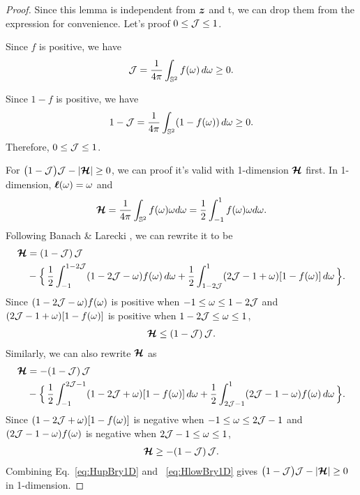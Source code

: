 \begin{proof}
  Since this lemma is independent from $\boldsymbol{z}$ and t, we can drop them from the expression for convenience.
  Let's proof $0\le\mathcal{J}\le1$.
  
  Since $f$ is positive, we have
    \begin{equation}
      \mathcal{J}=\frac{1}{4\pi}\int_{\mathbb{S}^{2}}f(\omega)\,d\omega\ge0.
    \end{equation}
    
  Since $1-f$ is positive, we have
    \begin{equation}
      1-\mathcal{J}=\frac{1}{4\pi}\int_{\mathbb{S}^{2}}(1-f(\omega))\,d\omega\ge0.
    \end{equation}
    Therefore, $0\le\mathcal{J}\le1$.

    For $\big(1-\mathcal{J}\big)\mathcal{J}-|\boldsymbol{\mathcal{H}}|\ge0$, we can proof it's valid with 1-dimension $\boldsymbol{\mathcal{H}}$ first.
    In 1-dimension, $\boldsymbol{\ell}(\omega) = \omega$ and
    \begin{equation}
    \boldsymbol{\mathcal{H}}
      =\frac{1}{4\pi}\int_{\mathbb{S}^{2}}f(\omega) \omega d\omega = \frac{1}{2}\int_{-1}^{1}f(\omega) \omega d\omega.
    \end{equation}
    Following Banach \& Larecki \cite{banachLarecki_2017}, we can rewrite it to be
    \begin{align}
    \boldsymbol{\mathcal{H}}
        &=(1-\mathcal{J})\,\mathcal{J} \nonumber \\
        &-\Big\{\,
          \frac{1}{2}\int_{-1}^{1-2\mathcal{J}}(1-2\mathcal{J}-\omega)f(\omega)\,d\omega
          +\frac{1}{2}\int_{1-2\mathcal{J}}^{1}(2\mathcal{J}-1+\omega)[1-f(\omega)]\,d\omega
        \,\Big\}.
        \label{eq:momentumRewrite1}
    \end{align}
    Since $(1-2\mathcal{J}-\omega)f(\omega)$ is positive when $-1\leq\omega\leq1-2\mathcal{J}$ and $(2\mathcal{J}-1+\omega)[1-f(\omega)]$ is positive when $1-2\mathcal{J}\leq\omega\leq1$,
    \begin{align}
    \boldsymbol{\mathcal{H}} \leq (1-\mathcal{J})\,\mathcal{J}.
    \label{eq:HupBry1D}
    \end{align}
    Similarly, we can also rewrite $\boldsymbol{\mathcal{H}}$ as
    \begin{align}
     \boldsymbol{\mathcal{H}}
        &=-(1-\mathcal{J})\,\mathcal{J} \nonumber \\
        &-\Big\{\,
          \frac{1}{2}\int_{-1}^{2\mathcal{J}-1}(1-2\mathcal{J}+\omega)[1-f(\omega)]\,d\omega
          +\frac{1}{2}\int_{2\mathcal{J}-1}^{1}(2\mathcal{J}-1-\omega)f(\omega)\,d\omega
        \,\Big\}.
        \label{eq:momentumRewrite2}
    \end{align}
    Since $(1-2\mathcal{J}+\omega)[1-f(\omega)]$ is negative when $-1\leq\omega\leq2\mathcal{J}-1$ and $(2\mathcal{J}-1-\omega)f(\omega)$ is negative when $2\mathcal{J}-1\leq\omega\leq1$,
    \begin{align}
    \boldsymbol{\mathcal{H}} \geq -(1-\mathcal{J})\,\mathcal{J}.
     \label{eq:HlowBry1D}
    \end{align}
    Combining Eq.~\eqref{eq:HupBry1D} and ~\eqref{eq:HlowBry1D} gives $\big(1-\mathcal{J}\big)\mathcal{J}-|\boldsymbol{\mathcal{H}}|\ge0$ in 1-dimension.
\end{proof}


